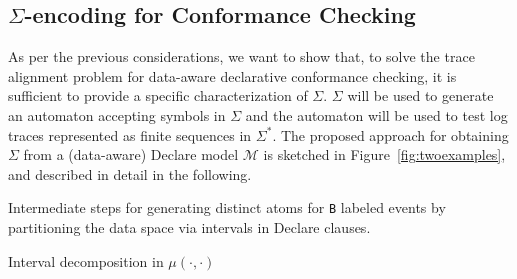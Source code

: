 

\subsection{$\Sigma$-encoding for Conformance Checking}\label{sec:dadtap}
As per the previous considerations, we want to show that, to solve the trace alignment problem for data-aware declarative conformance checking, it is sufficient to provide a specific characterization of $\Sigma$. $\Sigma$ will be used to generate an automaton accepting symbols in $\Sigma$ and the automaton will be used to test log traces represented as finite sequences in $\Sigma^*$. The proposed approach for obtaining $\Sigma$ from a (data-aware) Declare model $\mathcal{M}$ is sketched in Figure~\ref{fig:twoexamples}, and described in detail in the following.

\begin{table}[!t]
	\centering
	\captionsetup[subtable]{position = below}
	\captionsetup[table]{position=top}
	\caption{Intermediate steps for generating distinct atoms for \texttt{B} labeled events by partitioning the data space via intervals in Declare clauses.}
	\begin{subtable}{0.45\linewidth}
		\centering
		\caption{Interval decomposition in $\mu(\cdot, \cdot)$}
		\label{tab:dimFFT}
	\end{subtable}\quad
	\begin{subtable}{0.6\linewidth}
		\centering
		\caption{Atom generation for \texttt{B} by data space partitioning via $\times_{k\in K}\mu(\texttt{B},k)$}
		\label{tab:dimGMM}
	\end{subtable}
\end{table}

